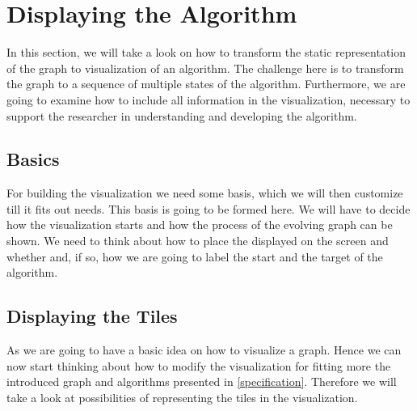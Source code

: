 \documentclass
[
	paper = a4,
    pagesize,
	12 pt,
	oneside,                       %
    open = right,
	DIV = calc,
	BCOR = 0 mm,                   %
	bibtotoc
]
{scrbook}
\begin{document}
\section{Displaying the Algorithm}

In this section, we will take a look on how to transform the static representation of the graph to visualization of an algorithm.
The challenge here is to transform the graph to a sequence of multiple states of the algorithm.
Furthermore, we are going to examine how to include all information in the visualization, necessary to support the researcher in understanding and developing the algorithm.




\subsection{Basics}

For building the visualization we need some basis, which we will then customize till it fits out needs.
This basis is going to be formed here.
We will have to decide how the visualization starts and how the process of the evolving graph can be shown.
We need to think about how to place the displayed on the screen and whether and, if so, how we are going to label the start and the target of the algorithm.



\subsection{Displaying the Tiles}

As we are going to have a basic idea on how to visualize a graph.
Hence we can now start thinking about how to modify the visualization for fitting more the introduced graph and algorithms presented in \cref{specification}.
Therefore we will take a look at possibilities of representing the tiles in the visualization.
\end{document}
